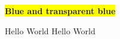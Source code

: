 \documentclass[12pt]{article}
\begin{document}
\colorbox{yellow}{%
  \bfseries
  \color{blue}%
  Blue and %
  transparent blue%
}

\bigskip
Hello World
Hello World
\end{document}

